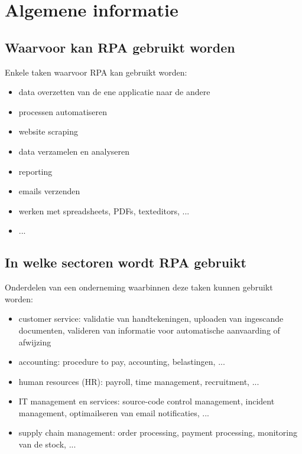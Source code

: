 \section{Algemene informatie}

\subsection{Waarvoor kan RPA gebruikt worden}
Enkele taken waarvoor RPA kan gebruikt worden:
\begin{itemize}
	\item data overzetten van de ene applicatie naar de andere
	\item processen automatiseren
	\item website scraping
	\item data verzamelen en analyseren
	\item reporting
	\item emails verzenden
	\item werken met spreadsheets, PDFs, texteditors, ...
	\item ...
\end{itemize}
\autocite{everythingRPA} \autocite{idrRPA}

\subsection{In welke sectoren wordt RPA gebruikt}
Onderdelen van een onderneming waarbinnen deze taken kunnen gebruikt worden:
\begin{itemize}
	\item customer service: validatie van handtekeningen, uploaden van ingescande documenten, valideren van informatie voor automatische aanvaarding of afwijzing
	\item accounting: procedure to pay, accounting, belastingen, ...
	\item human resources (HR): payroll, time management, recruitment, ...
	\item IT management en services: source-code control management, incident management, optimailseren van email notificaties, ...
	\item supply chain management: order processing, payment processing, monitoring van de stock, ...
\end{itemize}
\autocite{everythingRPA}


